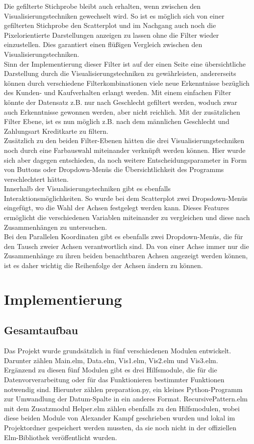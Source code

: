 \documentclass[usegeometry=true]{scrartcl}
\begin{document}
\noindent Die gefilterte Stichprobe bleibt auch erhalten, wenn zwischen den Visualisierungstechniken gewechselt wird. So ist es möglich sich von einer gefilterten Stichprobe den
Scatterplot und im Nachgang auch noch die Pixelorientierte Darstellungen anzeigen zu lassen ohne die Filter wieder einzustellen. Dies garantiert einen flüßigen Vergleich
zwischen den Visualisierungstechniken.\\
Sinn der Implementierung dieser Filter ist auf der einen Seite eine übersichtliche Darstellung durch die Visualisierungstechniken zu gewährleisten,
andererseits können durch verschiedene Filterkombinationen viele neue Erkenntnisse bezüglich des Kunden- und Kaufverhalten erlangt werden. Mit einem einfachen Filter könnte
der Datensatz z.B. nur nach Geschlecht gefiltert werden, woduch zwar auch Erkenntnisse gewonnen werden, aber nicht reichlich. Mit der zusätzlichen Filter Ebene, ist es nun
möglich z.B. nach dem männlichen Geschlecht und Zahlungsart Kreditkarte zu filtern. \\
Zusätzlich zu den beiden Filter-Ebenen hätten die drei Visualisierungstechniken noch durch eine Farbauswahl miteinander verknüpft werden können. Hier wurde sich aber dagegen
entschieden, da noch weitere Entscheidungsparameter in Form von Buttons oder Dropdown-Menüs die Übersichtlichkeit des Programms verschlechtert hätten.\\
\noindent Innerhalb der Visualisierungstechniken gibt es ebenfalls Interaktionsmöglichkeiten. So wurde bei dem Scatterplot zwei Dropsdown-Menüs eingefügt, wo die Wahl der Achsen
festgelegt werden kann. Dieses Features ermöglicht die verschiedenen Variablen miteinander zu vergleichen und diese nach Zusammenhängen zu untersuchen.\\
Bei den Parallelen Koordinaten gibt es ebenfalls zwei Dropdown-Menüs, die für den Tausch zweier Achsen verantwortlich sind. Da von einer Achse immer nur die Zusammenhänge zu
ihren beiden benachtbaren Achsen angezeigt werden können, ist es daher wichtig die Reihenfolge der Achsen ändern zu können.

\section{Implementierung}
\subsection{Gesamtaufbau}
Das Projekt wurde grundsätzlich in fünf verschiedenen Modulen entwickelt. Darunter zählen Main.elm, Data.elm, Vis1.elm, Vis2.elm und Vis3.elm. Ergänzend zu diesen fünf Modulen
gibt es drei Hilfsmodule, die für die Datenvorverarbeitung oder für das Funktionieren bestimmter Funktionen notwendig sind. Hierunter zählen preparation.py, ein kleines
Python-Programm zur Umwandlung der Datum-Spalte in ein anderes Format. RecursivePattern.elm mit dem Zusatzmodul Helper.elm zählen ebenfalls zu den Hilfsmodulen, wobei diese beiden
Module von Alexander Kampf geschrieben wurden und lokal im Projektordner gespeichert werden mussten, da sie noch nicht in der offiziellen Elm-Bibliothek veröffentlicht wurden.
\end{document}
